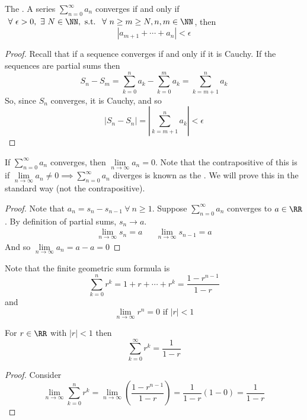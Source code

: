 \documentclass[12pt]{scrartcl}
\begin{document}
\begin{theorem}
  The . A series $\sum_{n=0}^\infty a_n$ converges 
  if and only if $\ \forall \ \epsilon > 0, \ \exists \ N \in \NN, \text{ s.t. } \ \forall \ n \geq m \geq N, n,m \in \NN$, then 
  \[|a_{m+1} + \cdots + a_n| < \epsilon\]
  \begin{proof}
    Recall that if a sequence converges if and only if it is Cauchy. If the sequences are partial sums then 
    \[S_n - S_m = \sum_{k=0}^n a_k - \sum_{k=0}^m a_k = \sum_{k=m+1}^n a_k\]
    So, since $S_n$ converges, it is Cauchy, and so 
    \[|S_n - S_n| = |\sum_{k=m+1}^n a_k| < \epsilon\]
  \end{proof}
\end{theorem}

\begin{theorem}
  If $\sum_{n = 0}^\infty a_n$ converges, then $\underset{n\to\infty}{\lim}a_n = 0$. Note that the contrapositive of this is 
  if $\underset{n\to\infty}{\lim}a_n \neq 0 \implies \sum_{n=0}^\infty a_n$ diverges is known as the .
  We will prove this in the standard way (not the contrapositive).

  \begin{proof}
    Note that $a_n = s_n - s_{n-1} \ \forall \ n \geq 1$. Suppose $\sum_{n=0}^\infty a_n$ converges to $a \in \RR$. By definition of partial sums, $s_n \to a$.
    \begin{align*}
      \lim_{n\to\infty} s_n = a && \lim_{n\to\infty} s_{n-1} = a
    \end{align*}
    And so $\underset{n\to\infty}{\lim}a_n = a - a = 0$
  \end{proof}
\end{theorem}

\begin{note}
  Note that the finite geometric sum formula is 
  \[\sum_{k=0}^n r^k = 1 + r + \cdots + r^k = \frac{1-r^{n-1}}{1 - r}\]
  and 
  \[\lim_{n\to\infty} r^n = 0 \text{ if } |r| < 1\]
\end{note}

\begin{proposition}
  For $r \in \RR$ with $|r| < 1$ then 
  \[\sum_{k=0}^\infty r^k = \frac{1}{1-r}\]
  \begin{proof}
    Consider 
    \[\underset{n\to\infty}{\lim}\sum_{k=0}^n r^k = \underset{n\to\infty}{\lim}(\frac{1-r^{n-1}}{1-r}) = \frac{1}{1-r}(1-0) = \frac{1}{1-r}\]
  \end{proof}
\end{proposition}
\end{document}
